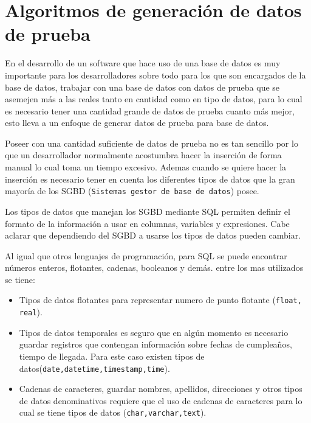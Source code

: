 \chapter{Algoritmos de generaci\'on de datos de prueba}
En el desarrollo de un software que hace uso de una base de datos es muy importante para los desarrolladores sobre todo para los que son encargados de la base de datos, trabajar con una base de datos con datos de prueba  que se asemejen m\'as a las reales tanto en cantidad como en tipo de datos, para lo cual es necesario tener una cantidad grande de datos de prueba cuanto m\'as mejor, esto lleva a un enfoque de generar datos de prueba para base de datos.


Poseer con una cantidad suficiente de datos de prueba no es tan sencillo por lo que un desarrollador normalmente acostumbra hacer la inserci\'on de forma manual lo cual toma un  tiempo excesivo. Ademas cuando se quiere hacer la inserci\'on es necesario tener en cuenta los diferentes tipos de datos que la gran mayor\'ia de los SGBD (\texttt{Sistemas gestor de base de datos}) posee.
 
Los tipos de datos que manejan los SGBD mediante SQL permiten definir el formato de la informaci\'on a usar en  columnas, variables y expresiones. Cabe aclarar que dependiendo del SGBD a usarse los tipos de datos pueden cambiar.

Al igual que otros lenguajes de programaci\'on, para SQL se puede encontrar n\'umeros enteros, flotantes, cadenas, booleanos y dem\'as. entre los mas utilizados se tiene:

\begin{itemize}
\item Tipos de datos flotantes para representar numero de punto flotante (\texttt{float, real}).
\item Tipos de datos temporales es seguro que en alg\'un momento es necesario guardar registros que contengan informaci\'on sobre fechas de cumplea\~nos, tiempo de llegada. Para este caso existen tipos de datos(\texttt{date,datetime,timestamp,time}).
\item Cadenas de caracteres, guardar nombres, apellidos, direcciones y otros tipos de datos denominativos requiere que el uso de cadenas de caracteres para lo cual se tiene tipos de datos (\texttt{char,varchar,text}).
\end{itemize}

